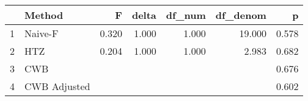 \begin{table}[ht]
\centering
\begin{tabular}{rlrrrrr}
  \hline
 & Method & F & delta & df\_num & df\_denom & p \\ 
  \hline
1 & Naive-F & 0.320 & 1.000 & 1.000 & 19.000 & 0.578 \\ 
  2 & HTZ & 0.204 & 1.000 & 1.000 & 2.983 & 0.682 \\ 
  3 & CWB &  &  &  &  & 0.676 \\ 
  4 & CWB Adjusted &  &  &  &  & 0.602 \\ 
   \hline
\end{tabular}
\end{table}
